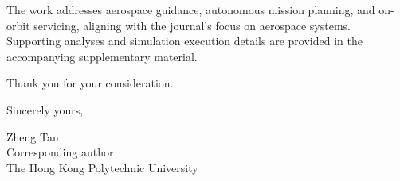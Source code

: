 \documentclass[10pt]{article}
\newcommand{\CorrespondingAuthor}{Zheng Tan}
\begin{document}
The work addresses aerospace guidance, autonomous mission planning, and on-orbit servicing, aligning with the journal's focus on aerospace systems. Supporting analyses and simulation execution details are provided in the accompanying supplementary material.

Thank you for your consideration.

Sincerely yours,

\vspace{0.5em}
\CorrespondingAuthor\\
Corresponding author\\
The Hong Kong Polytechnic University
\end{document}
